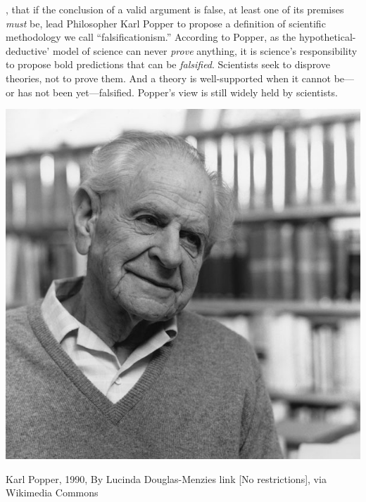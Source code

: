 \begin{refsection}
, that if the conclusion of a valid argument is false, at least one of its premises \emph{must} be, lead Philosopher Karl Popper to propose a definition of scientific methodology we call ``falsificationism.'' According to Popper, as the hypothetical-deductive' model of science can never \emph{prove} anything, it is science's responsibility to propose bold predictions that can be \emph{falsified}. Scientists seek to disprove theories, not to prove them. And a theory is well-supported when it cannot be---or has not been yet---falsified. Popper's view is still widely held by scientists. \begin{marginfigure}
 \begin{center}
     \includegraphics[scale=0.50]{../images/Karl_Popper2.jpg}
\end{center}
 \caption{Karl Popper, 1990, By Lucinda Douglas-Menzies  link [No restrictions], via Wikimedia Commons
}
\label{fig: karlpopper}
\end{marginfigure} 


\end{refsection}
